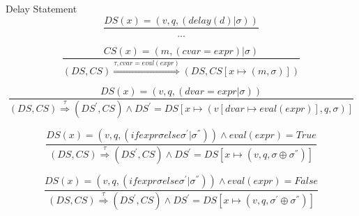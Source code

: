 \documentclass[]{article}
\begin{document}
Delay Statement
\begin{equation}\label{DelayStatement}
\frac
{
	DS(x)=(v,q,(delay(d)|\sigma)) 
}
{
	...
}
\end{equation}

\begin{equation}\label{ContinuousVariableAssignment}
\frac
{
	CS(x)=(m,(cvar=expr)|\sigma)
}
{
	(DS,CS)\overset{\tau,cvar=eval(expr)}{\Rightarrow}(DS,CS[x\longmapsto(m,\sigma)])
}
\end{equation}

\begin{equation}\label{DiscreteVariableAssignment}
\frac
{
	DS(x)=(v,q,(dvar=expr|\sigma))
}
{
	(DS,CS)\overset{\tau}{\Rightarrow}(DS^{'},CS) \wedge DS^{'}=DS[x \longmapsto(v[dvar\longmapsto eval(expr)],q,\sigma)]
}
\end{equation}

\begin{equation}\label{ConditionalTrue}
\frac
{
	DS(x)=(v,q,(if expr \sigma else \sigma ^{'} |\sigma ^{''})) \wedge eval(expr) = True
}
{
	(DS,CS)\overset{\tau}{\Rightarrow}(DS^{'},CS) \wedge DS^{'}=DS[x \longmapsto(v,q,\sigma \oplus \sigma ^{''})]
}
\end{equation}

\begin{equation}\label{ConditionalFalse}
\frac
{
	DS(x)=(v,q,(if expr \sigma else \sigma ^{'} |\sigma ^{''})) \wedge eval(expr) = False
}
{
	(DS,CS)\overset{\tau}{\Rightarrow}(DS^{'},CS) \wedge DS^{'}=DS[x \longmapsto(v,q,\sigma ^{'} \oplus \sigma ^{''})]
}
\end{equation}
\end{document}
